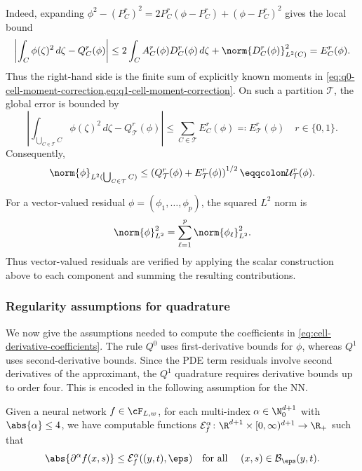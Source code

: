 Indeed, expanding
$\phi^2-(P_C^r)^2=2P_C^r(\phi-P_C^r)+(\phi-P_C^r)^2$ gives the local bound
\begin{equation}\label{eq:cell-verified-quadrature-error}
  \left|
  \int_C \phi(\zeta)^2\,d\zeta-Q_C^r(\phi)
  \right|
  \leq
  2\int_C A_C^r(\phi)D_C^r(\phi)\,d\zeta
  +\norm{D_C^r(\phi)}_{L^2(C)}^2
  =E_C^r(\phi).
\end{equation}
Thus the right-hand side is the finite sum of explicitly known moments in
\cref{eq:q0-cell-moment-correction,eq:q1-cell-moment-correction}.  On such a
partition $\mathcal T$, the global error is bounded by
\begin{equation}\label{eq:partition-verified-quadrature-error}
  \left|
  \int_{\bigcup_{C\in\mathcal T}C}\phi(\zeta)^2\,d\zeta
  - Q_{\mathcal T}^r(\phi)
  \right|
  \leq
  \sum_{C\in\mathcal T}E_C^r(\phi)
  \eqqcolon   E_{\mathcal T}^r(\phi)
  \quad r\in\{0,1\}.
\end{equation}
Consequently,
\begin{equation}\label{eq:global-norm-bound}
  \norm{\phi}_{L^2(\bigcup_{C\in\mathcal T}C)}
  \leq
  \left(Q_{\mathcal T}^r(\phi)+E_{\mathcal T}^r(\phi)\right)^{1/2}
  \eqqcolon\mathcal U_{\mathcal T}^r(\phi).
\end{equation}

\begin{remark}\label{rem:vector-residual-bounds}
For a vector-valued residual $\phi=(\phi_1,\dots,\phi_p)$, the squared
$L^2$ norm is
\[
  \norm{\phi}_{L^2}^2=\sum_{\ell=1}^p\norm{\phi_\ell}_{L^2}^2.
\]
Thus vector-valued residuals are verified by applying the scalar construction
above to each component and summing the resulting contributions.
\end{remark}

\subsubsection{Regularity assumptions for quadrature}

We now give the assumptions needed to compute the coefficients in
\eqref{eq:cell-derivative-coefficients}.  The rule $Q^0$ uses first-derivative
bounds for $\phi$, whereas $Q^1$ uses second-derivative bounds.
Since the PDE term residuals involve second derivatives of the
approximant, the $Q^1$ quadrature requires derivative bounds
up to order four.  This is encoded in the following assumption for the NN.
\begin{assumption}\label{ass:network-derivative-bounds}
  Given a neural network $f \in \cF_{L, w}$, for each multi-index $\alpha \in \N_0^{d+1}$ with
  $\abs{\alpha} \leq 4$, we have computable functions
  $\mathcal{E}^{\alpha}_f \colon \R^{d+1} \times [0, \infty)^{d+1} \to \R_+$ such that
  \[
    \abs{\partial^\alpha f(x, s)}
    \leq
    \mathcal{E}^\alpha_f((y, t),\boldsymbol{\eps})
    \quad
    \text{for all }
    \quad (x, s) \in \mathcal B_{\boldsymbol{\eps}}(y,t).
  \]
\end{assumption}

